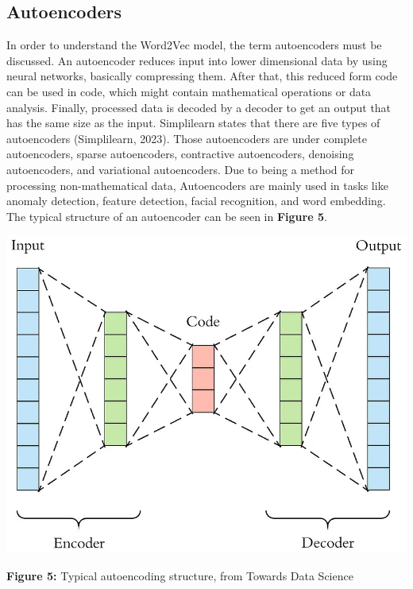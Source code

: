 \documentclass[man]{apa7}
\begin{document}
\subsection{Autoencoders}

In order to understand the Word2Vec model, the term autoencoders must be discussed. An autoencoder reduces input into lower dimensional data by using neural networks, basically compressing them. After that, this reduced form code can be used in code, which might contain mathematical operations or data analysis. Finally, processed data is decoded by a decoder to get an output that has the same size as the input. Simplilearn states that there are five types of autoencoders (Simplilearn, 2023). Those autoencoders are under complete autoencoders, sparse autoencoders, contractive autoencoders, denoising autoencoders, and variational autoencoders.
Due to being a method for processing non-mathematical data, Autoencoders are mainly used in tasks like anomaly detection, feature detection, facial recognition, and word embedding. The typical structure of an autoencoder can be seen in \textbf{Figure 5}.\\

\begin{center}

\includegraphics[scale=0.4]{autoencoding.jpg}

\textbf{Figure 5:} Typical autoencoding structure, from Towards Data Science\\[2\baselineskip]

\end{center}
\end{document}
